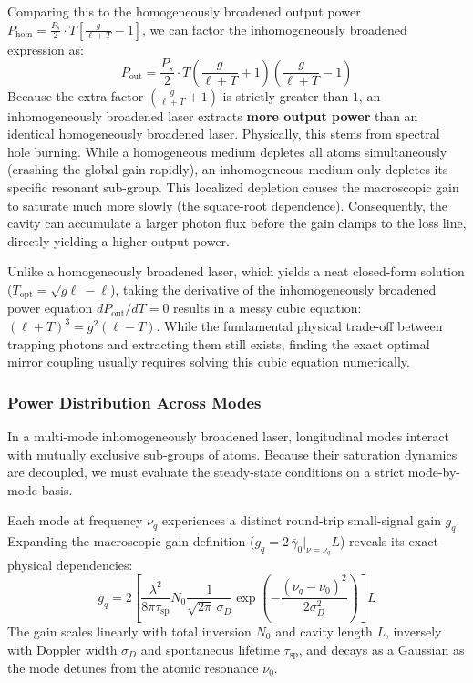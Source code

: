 Comparing this to the homogeneously broadened output power $P_{\mathrm{hom}} = \frac{P_s}{2}\cdot T \left[ \frac{g}{\ell + T} - 1 \right]$, we can factor the inhomogeneously broadened expression as:
\begin{equation*}
    P_{\text{out}} = \frac{P_s}{2}\cdot T \left( \frac{g}{\ell + T} + 1 \right)\!\left( \frac{g}{\ell + T} - 1 \right)
\end{equation*}
Because the extra factor $( \frac{g}{\ell + T} + 1 )$ is strictly greater than $1$, an inhomogeneously broadened laser extracts \textbf{more output power} than an identical homogeneously broadened laser. Physically, this stems from spectral hole burning. While a homogeneous medium depletes all atoms simultaneously (crashing the global gain rapidly), an inhomogeneous medium only depletes its specific resonant sub-group. This localized depletion causes the macroscopic gain to saturate much more slowly (the square-root dependence). Consequently, the cavity can accumulate a larger photon flux before the gain clamps to the loss line, directly yielding a higher output power.

\begin{keyinsight}
    Unlike a homogeneously broadened laser, which yields a neat closed-form solution ($T_{\text{opt}} = \sqrt{g\ell} - \ell$), taking the derivative of the inhomogeneously broadened power equation $dP_{\text{out}}/dT = 0$ results in a messy cubic equation: $(\ell + T)^3 = g^2(\ell - T)$. While the fundamental physical trade-off between trapping photons and extracting them still exists, finding the exact optimal mirror coupling usually requires solving this cubic equation numerically.
\end{keyinsight}

\subsubsection{Power Distribution Across Modes}

In a multi-mode inhomogeneously broadened laser, longitudinal modes interact with mutually exclusive sub-groups of atoms. Because their saturation dynamics are decoupled, we must evaluate the steady-state conditions on a strict mode-by-mode basis.

Each mode at frequency $\nu_q$ experiences a distinct round-trip small-signal gain $g_q$. Expanding the macroscopic gain definition ($g_q = 2 \, \bar{\gamma}_0 \big|_{\nu = \nu_q} L$) reveals its exact physical dependencies:
\begin{equation*}
    g_q = 2 \left[ \frac{\lambda^2}{8\pi\tau_{\mathrm{sp}}} N_0 \frac{1}{\sqrt{2\pi}\,\sigma_D} \exp\!\left(-\frac{(\nu_q - \nu_0)^2}{2\sigma_D^2}\right) \right] L
\end{equation*}
The gain scales linearly with total inversion $N_0$ and cavity length $L$, inversely with Doppler width $\sigma_D$ and spontaneous lifetime $\tau_{\text{sp}}$, and decays as a Gaussian as the mode detunes from the atomic resonance $\nu_0$.


